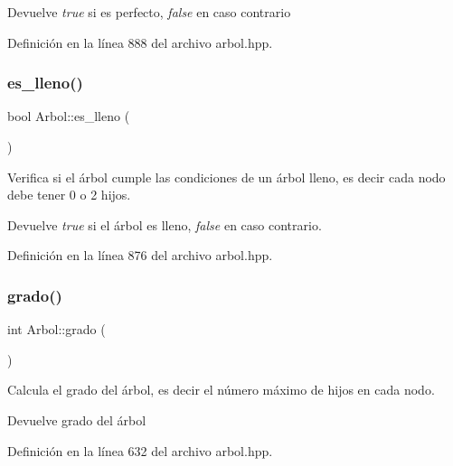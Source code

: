 \begin{DoxyReturn}{Devuelve}
{\itshape true} si es perfecto, {\itshape false} en caso contrario 
\end{DoxyReturn}


Definición en la línea 888 del archivo arbol.\+hpp.

\mbox{\label{classArbol_a14ccdbb79a82bf19a24449acaea6c413}} 
\subsubsection{\texorpdfstring{es\+\_\+lleno()}{es\_lleno()}}
{\footnotesize\ttfamily bool Arbol\+::es\+\_\+lleno (\begin{DoxyParamCaption}{ }\end{DoxyParamCaption})}



Verifica si el árbol cumple las condiciones de un árbol lleno, es decir cada nodo debe tener 0 o 2 hijos. 

\begin{DoxyReturn}{Devuelve}
{\itshape true} si el árbol es lleno, {\itshape false} en caso contrario. 
\end{DoxyReturn}


Definición en la línea 876 del archivo arbol.\+hpp.

\mbox{\label{classArbol_a99e608849650b891c34852a81f93d4ab}} 
\subsubsection{\texorpdfstring{grado()}{grado()}}
{\footnotesize\ttfamily int Arbol\+::grado (\begin{DoxyParamCaption}{ }\end{DoxyParamCaption})}



Calcula el grado del árbol, es decir el número máximo de hijos en cada nodo. 

\begin{DoxyReturn}{Devuelve}
grado del árbol 
\end{DoxyReturn}


Definición en la línea 632 del archivo arbol.\+hpp.

\mbox{\label{classArbol_a59ae16f1a68c5e5afd08be20dcbf5717}} 
